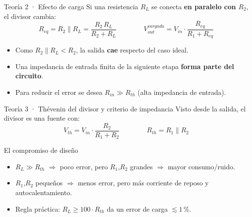 \documentclass[aspectratio=169]{beamer}
\begin{document}
\begin{frame}{Teoría 2 · Efecto de carga}
  Si una resistencia $R_L$ se conecta \textbf{en paralelo con $R_2$}, el divisor cambia:
  \[
    R_{eq} = R_2 \parallel R_L = \frac{R_2\,R_L}{R_2+R_L}
    \qquad\qquad
    V_{out}^{cargada} = V_{in}\cdot\frac{R_{eq}}{R_1+R_{eq}}
  \]
  \pause
  \begin{itemize}
    \item Como $R_2 \parallel R_L < R_2$, la salida \textbf{cae} respecto del caso ideal.
    \item Una impedancia de entrada finita de la siguiente etapa \textbf{forma parte del circuito}.
    \item Para reducir el error se desea $R_{in} \gg R_{th}$ (alta impedancia de entrada).
  \end{itemize}
\end{frame}

\begin{frame}{Teoría 3 · Thévenin del divisor y criterio de impedancia}
  Visto desde la salida, el divisor es una fuente con:
  \[
    V_{th} = V_{in}\cdot\frac{R_2}{R_1+R_2}
    \qquad\qquad
    R_{th} = R_1 \parallel R_2
  \]
  \pause
  \begin{block}{El compromiso de diseño}
    \begin{itemize}
      \item $R_L \gg R_{th}$ $\Rightarrow$ poco error, pero $R_1$,$R_2$ grandes $\Rightarrow$ mayor consumo/ruido.
      \item $R_1$,$R_2$ pequeños $\Rightarrow$ menos error, pero más corriente de reposo y autocalentamiento.
      \item Regla práctica: $R_L \ge 100\cdot R_{th}$ da un error de carga $\lesssim 1\,\text{\%}$.
    \end{itemize}
  \end{block}
\end{frame}
\end{document}
